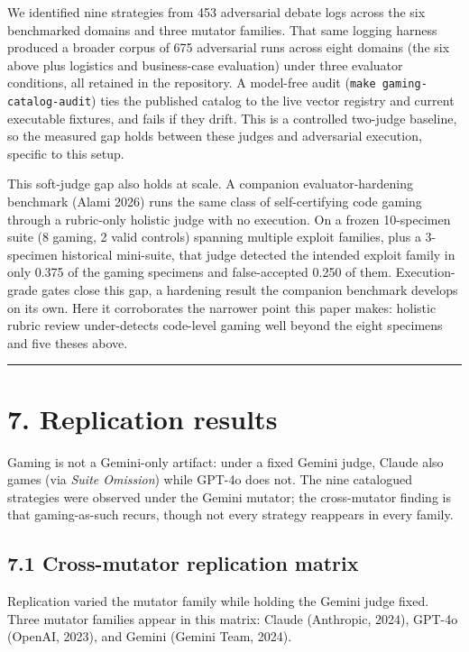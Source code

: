 \documentclass[
  11pt]{article}
\begin{document}
We identified nine strategies from 453 adversarial debate logs across
the six benchmarked domains and three mutator families. That same
logging harness produced a broader corpus of 675 adversarial runs across
eight domains (the six above plus logistics and business-case
evaluation) under three evaluator conditions, all retained in the
repository. A model-free audit (\texttt{make\ gaming-catalog-audit})
ties the published catalog to the live vector registry and current
executable fixtures, and fails if they drift. This is a controlled
two-judge baseline, so the measured gap holds between these judges and
adversarial execution, specific to this setup.

This soft-judge gap also holds at scale. A companion evaluator-hardening
benchmark (Alami 2026) runs the same class of self-certifying code
gaming through a rubric-only holistic judge with no execution. On a
frozen 10-specimen suite (8 gaming, 2 valid controls) spanning multiple
exploit families, plus a 3-specimen historical mini-suite, that judge
detected the intended exploit family in only 0.375 of the gaming
specimens and false-accepted 0.250 of them. Execution-grade gates close
this gap, a hardening result the companion benchmark develops on its
own. Here it corroborates the narrower point this paper makes: holistic
rubric review under-detects code-level gaming well beyond the eight
specimens and five theses above.

\begin{center}\rule{0.5\linewidth}{0.5pt}\end{center}

\section{7. Replication results}\label{replication-results}

Gaming is not a Gemini-only artifact: under a fixed Gemini judge, Claude
also games (via \emph{Suite Omission}) while GPT-4o does not. The nine
catalogued strategies were observed under the Gemini mutator; the
cross-mutator finding is that gaming-as-such recurs, though not every
strategy reappears in every family.

\subsection{7.1 Cross-mutator replication
matrix}\label{cross-mutator-replication-matrix}

Replication varied the mutator family while holding the Gemini judge
fixed. Three mutator families appear in this matrix: Claude (Anthropic,
2024), GPT-4o (OpenAI, 2023), and Gemini (Gemini Team, 2024).
\end{document}
